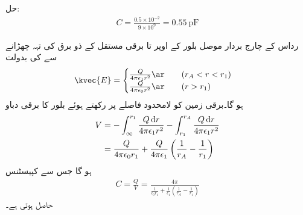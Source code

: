 حل: 
\begin{align*}
C=\frac{0.5 \times 10^{-2}}{9 \times 10^9}=\SI{0.55}{\pico \farad}
\end{align*}

 رداس کے چارج بردار موصل بلور کے اوپر  تا  برقی مستقل  کے ذو برق کی تہہ چھڑانے سے  کی بدولت
\begin{align*}
\kvec{E}=
\begin{cases}
\frac{Q}{4\pi\epsilon_1 r^2}\ar  \quad \quad (r_A < r < r_1) \\
\frac{Q}{4\pi\epsilon_0 r^2}\ar \quad \quad  (r >r_1)
\end{cases}
\end{align*}
ہو گا۔برقی زمین کو لامحدود فاصلے پر رکھتے ہوئے بلور کا برقی دباو
\begin{align*}
V&=-\int_{\infty}^{r_1}\frac{Q \dif r}{4\pi\epsilon_1 r^2} -\int_{r_1}^{r_A}\frac{Q \dif r}{4\pi\epsilon_1 r^2}\\
&=\frac{Q}{4\pi\epsilon_0 r_1} +\frac{Q}{4\pi\epsilon_1} \left(\frac{1}{r_A}-\frac{1}{r_1} \right)
\end{align*}
ہو گا جس سے کپیسٹنس
\begin{align}
C=\frac{Q}{V}=\frac{4\pi}{\frac{1}{\epsilon_0 r_1}+\frac{1}{\epsilon_1} \left(\frac{1}{r_A}-\frac{1}{r_1} \right)}
\end{align}
حاصل ہوتی ہے۔

